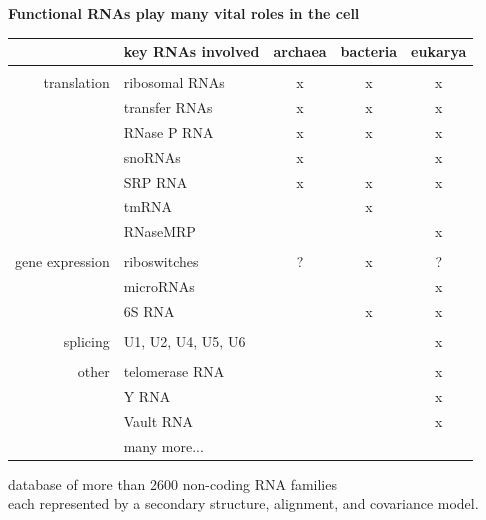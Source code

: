 \documentclass[landscape]{slides}
\begin{document}
\begin{slide}
\begin{center}
\textbf{Functional RNAs play many vital roles in the cell}
\end{center}
\medskip

\small
\begin{center}
\begin{tabular}{r|l|ccc}
 & key RNAs involved & archaea & bacteria & eukarya \\ \hline
 & \\ 
translation & ribosomal RNAs & x & x & x \\
            & transfer RNAs  & x & x & x \\
            & RNase P RNA    & x & x & x \\
            & snoRNAs        & x &   & x \\ 
            & SRP RNA        & x & x & x \\ 
            & tmRNA          &   & x &   \\ 
            & RNaseMRP       &   &   & x \\ 
            &  \\ 
gene expression & riboswitches & ? & x & ? \\
                & microRNAs &  & & x \\
                & 6S RNA & & x & x\\ 
                & \\ 
splicing        & U1, U2, U4, U5, U6 & & & x \\ 
                & \\
other           & telomerase RNA & & & x \\ 
                & Y RNA          & & & x \\
                & Vault RNA      & & & x \\
                & many more... & & & \\ 
\end{tabular}



database of more than 2600 non-coding RNA families \\ each represented by a
secondary structure, alignment, and covariance model.
\end{center}

\vfill
\end{slide}
\end{document}
